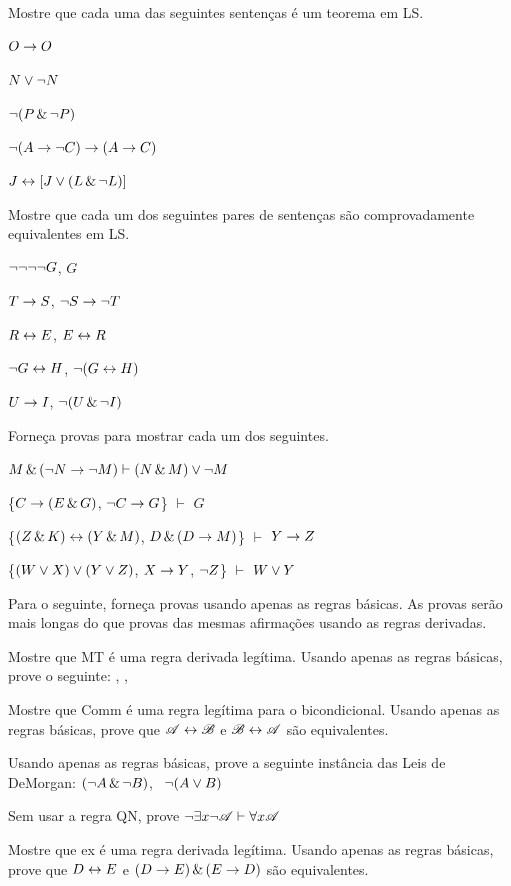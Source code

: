 \problempart
Mostre que cada uma das seguintes sentenças é um teorema em LS.
\begin{earg}
\item $O \rightarrow O$
\item $N \vee \neg N$
\item $\neg(P\,\&\, \neg P)$
\item $\neg(A \rightarrow \neg C) \rightarrow (A \rightarrow C)$
\item $J \leftrightarrow [J\vee (L\,\&\,\neg L)]$
\end{earg}

\problempart
Mostre que cada um dos seguintes pares de sentenças são comprovadamente equivalentes em LS.
\begin{earg}
\item $\neg\neg\neg\neg G$, $G$
\item $T\rightarrow S$, $\neg S \rightarrow \neg T$
\item $R \leftrightarrow E$, $E \leftrightarrow R$
\item $\neg G \leftrightarrow H$, $\neg(G \leftrightarrow H)$
\item $U \rightarrow I$, $\neg(U \,\&\, \neg I)$
\end{earg}

\problempart
Forneça provas para mostrar cada um dos seguintes.
\begin{earg}
\item $M \,\&\, (\neg N \rightarrow \neg M) \vdash (N \,\&\, M) \vee \neg M$
\item \{$C\rightarrow(E\,\&\, G)$, $\neg C \rightarrow G$\} $\vdash$ $G$
\item \{$(Z\,\&\, K)\leftrightarrow(Y\,\&\, M)$, $D\,\&\,(D\rightarrow M)$\} $\vdash$ $Y\rightarrow Z$
\item \{$(W \vee X) \vee (Y \vee Z)$, $X\rightarrow Y$, $\neg Z$\} $\vdash$ $W\vee Y$
\end{earg}



\problempart
Para o seguinte, forneça provas usando apenas as regras básicas. As provas serão mais longas do que provas das mesmas afirmações usando as regras derivadas.
\begin{earg}
\item Mostre que MT é uma regra derivada legítima. Usando apenas as regras básicas, prove o seguinte: \eif{}, \enot{}, \therefore\ \enot{}
\item Mostre que Comm é uma regra legítima para o bicondicional. Usando apenas as regras básicas, prove que $\mathscr{A}\leftrightarrow\mathscr{B}$ e $\mathscr{B}\leftrightarrow\mathscr{A}$ são equivalentes.
\item Usando apenas as regras básicas, prove a seguinte instância das Leis de DeMorgan: $(\neg A \,\&\, \neg B)$, \therefore\ $\neg(A \vee B)$
\item Sem usar a regra QN, prove $\neg\exists x\neg\mathscr{A} \vdash \forall x\mathscr{A}$
\item Mostre que {\eiff}{ex} é uma regra derivada legítima. Usando apenas as regras básicas, prove que $D\leftrightarrow E$ e $(D\rightarrow E)\,\&\,(E\rightarrow D)$ são equivalentes.
\end{earg}


